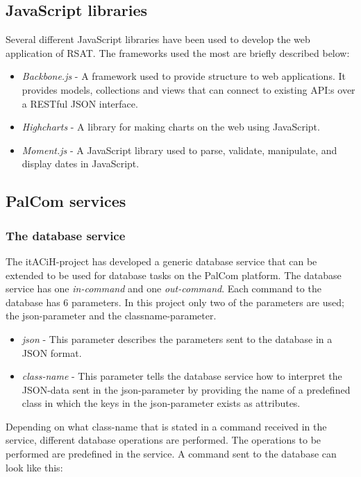 \documentclass{cslthse-msc}
\begin{document}
\subsection{JavaScript libraries}
Several different JavaScript libraries have been used to develop the web application of RSAT. The frameworks used the most are briefly described below: 

\begin{itemize}
    \item \emph{Backbone.js} - A framework used to provide structure to web applications. It provides models, collections and views that can connect to existing API:s over a RESTful JSON interface\cite{osmani2013developing}. 
    \item \emph{Highcharts} - A library for making charts on the web using JavaScript\cite{kuan2012learning}.
    \item \emph{Moment.js} - A JavaScript library used to parse, validate, manipulate, and display dates in JavaScript\cite{moment}.
\end{itemize}

\subsection{PalCom services}
\subsubsection{The database service}
\label{sec:dbservice}

The itACiH-project has developed a generic database service that can be extended to be used for database tasks on the PalCom platform. The database service has one \emph{in-command} and one \emph{out-command}. Each command to the database has 6 parameters. In this project only two of the parameters are used; the json-parameter and the classname-parameter. 

\begin{itemize}
    \item \emph{json} - This parameter describes the parameters sent to the database in a JSON format. 
    \item \emph{class-name} - This parameter tells the database service how to interpret the JSON-data sent in the json-parameter by providing the name of a predefined class in which the keys in the json-parameter exists as attributes.
\end{itemize}

Depending on what class-name that is stated in a command received in the service, different database operations are performed. The operations to be performed are predefined in the service. A command sent to the database can look like this: 
\end{document}

